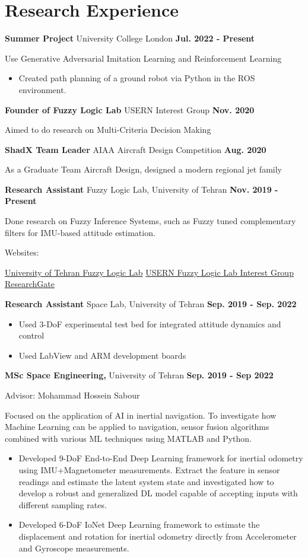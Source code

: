\documentclass[a4,25pt]{article}
\newenvironment{Experience}[1]{
    \section*{#1} \vspace{-.2cm}
    \hspace{.5cm}
    \begin{minipage}{0.95\linewidth}
    }{ \end{minipage}}
\newcommand{\experience}[3]{ 
  \vspace{0.1cm}\textbf{#1}{ #2} \hfill \textbf{#3} \par
}
\newcommand{\expdetail}[1]{
        {#1 } \par
}
\newcommand{\expdetails}[1]{
    \begin{itemize} 
    \item #1 \vspace{1pt}
    \end{itemize} 
}
\begin{document}
\begin{Experience}{Research Experience}
    \experience{Summer Project}{University College London}{Jul. 2022 - Present}
    \expdetail{Use Generative Adversarial Imitation Learning and Reinforcement Learning}
    \expdetails{Created path planning of a ground robot via Python in the ROS environment.}
    \experience{Founder of Fuzzy Logic Lab}{USERN Interest Group}{Nov. 2020}
    \expdetail{Aimed to do research on Multi-Criteria Decision Making}
    \experience{ShadX Team Leader}{AIAA Aircraft Design Competition}{Aug. 2020}
    \expdetail{As a Graduate Team Aircraft Design, designed a modern regional jet family}
    \experience{Research Assistant}{Fuzzy Logic Lab, University of Tehran}{Nov. 2019 - Present}
    \expdetail{Done research on Fuzzy Inference Systems, such as Fuzzy tuned complementary filters for IMU-based attitude estimation.}
    \expdetail{Websites:}
    \expdetail{\hspace{1cm}\href{https://fuzzylogic.ut.ac.ir/en/page/7122/arman-asgharpoor}{\faGlobe \hspace{ 0.2cm} University of Tehran Fuzzy Logic Lab} \hspace{ 0.75cm} \href{https://usern.tums.ac.ir/Group/Info/FLLIG}{\faGlobe \hspace{ 0.2cm}USERN Fuzzy Logic Lab Interest Group}  \hspace{ 0.75cm}\href{https://www.researchgate.net/lab/Fuzzy-Lab-Mohammad-H-Sabour}{\faGlobe \hspace{ 0.2cm}ResearchGate}}
    \experience{Research Assistant}{Space Lab, University of Tehran}{Sep. 2019 - Sep. 2022}
    \expdetails{Used 3-DoF experimental test bed for integrated attitude dynamics and control}
    \expdetails{Used LabView and ARM development boards}
    \experience{MSc Space Engineering, }{University of Tehran}{Sep. 2019 - Sep 2022}
    \expdetail{Advisor: Mohammad Hossein Sabour}
    \expdetail{Focused on the application of AI in inertial navigation. To investigate how Machine Learning can be applied to navigation, sensor fusion algorithms combined with various ML techniques using MATLAB and Python.}
    \expdetails{Developed 9-DoF End-to-End Deep Learning framework for inertial odometry using IMU+Magnetometer measurements. Extract the feature in sensor readings and estimate the latent system state and investigated how to develop a robust and generalized DL model capable of accepting inputs with different sampling rates.}
    \expdetails{Developed 6-DoF IoNet Deep Learning framework to estimate the displacement and rotation for inertial odometry directly from Accelerometer and Gyroscope measurements.}

\end{Experience}
\end{document}
